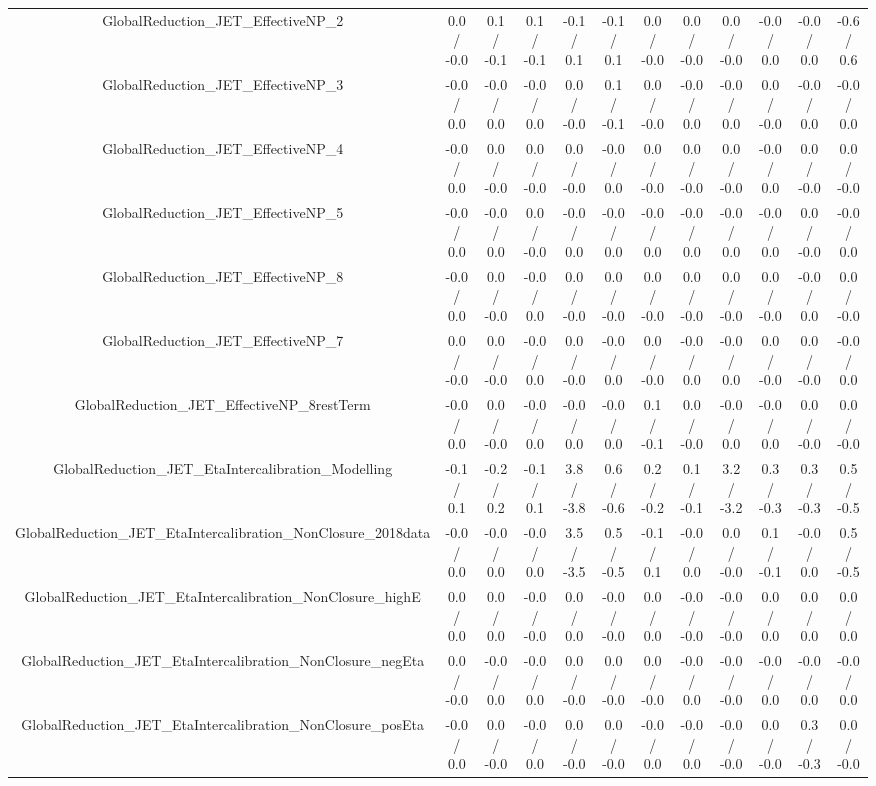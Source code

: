 \begin{table}[htbp]
\begin{center}
\begin{tabular}{|c|c|c|c|c|c|c|c|c|c|c|c|}
  GlobalReduction_JET_EffectiveNP_2 & 0.0 / -0.0 & 0.1 / -0.1 & 0.1 / -0.1 & -0.1 / 0.1 & -0.1 / 0.1 & 0.0 / -0.0 & 0.0 / -0.0 & 0.0 / -0.0 & -0.0 / 0.0 & -0.0 / 0.0 & -0.6 / 0.6 \\ 
  GlobalReduction_JET_EffectiveNP_3 & -0.0 / 0.0 & -0.0 / 0.0 & -0.0 / 0.0 & 0.0 / -0.0 & 0.1 / -0.1 & 0.0 / -0.0 & -0.0 / 0.0 & -0.0 / 0.0 & 0.0 / -0.0 & -0.0 / 0.0 & -0.0 / 0.0 \\ 
  GlobalReduction_JET_EffectiveNP_4 & -0.0 / 0.0 & 0.0 / -0.0 & 0.0 / -0.0 & 0.0 / -0.0 & -0.0 / 0.0 & 0.0 / -0.0 & 0.0 / -0.0 & 0.0 / -0.0 & -0.0 / 0.0 & 0.0 / -0.0 & 0.0 / -0.0 \\ 
  GlobalReduction_JET_EffectiveNP_5 & -0.0 / 0.0 & -0.0 / 0.0 & 0.0 / -0.0 & -0.0 / 0.0 & -0.0 / 0.0 & -0.0 / 0.0 & -0.0 / 0.0 & -0.0 / 0.0 & -0.0 / 0.0 & 0.0 / -0.0 & -0.0 / 0.0 \\ 
  GlobalReduction_JET_EffectiveNP_8 & -0.0 / 0.0 & 0.0 / -0.0 & -0.0 / 0.0 & 0.0 / -0.0 & 0.0 / -0.0 & 0.0 / -0.0 & 0.0 / -0.0 & 0.0 / -0.0 & 0.0 / -0.0 & -0.0 / 0.0 & 0.0 / -0.0 \\ 
  GlobalReduction_JET_EffectiveNP_7 & 0.0 / -0.0 & 0.0 / -0.0 & -0.0 / 0.0 & 0.0 / -0.0 & -0.0 / 0.0 & 0.0 / -0.0 & -0.0 / 0.0 & -0.0 / 0.0 & 0.0 / -0.0 & 0.0 / -0.0 & -0.0 / 0.0 \\ 
  GlobalReduction_JET_EffectiveNP_8restTerm & -0.0 / 0.0 & 0.0 / -0.0 & -0.0 / 0.0 & -0.0 / 0.0 & -0.0 / 0.0 & 0.1 / -0.1 & 0.0 / -0.0 & -0.0 / 0.0 & -0.0 / 0.0 & 0.0 / -0.0 & 0.0 / -0.0 \\ 
  GlobalReduction_JET_EtaIntercalibration_Modelling & -0.1 / 0.1 & -0.2 / 0.2 & -0.1 / 0.1 & 3.8 / -3.8 & 0.6 / -0.6 & 0.2 / -0.2 & 0.1 / -0.1 & 3.2 / -3.2 & 0.3 / -0.3 & 0.3 / -0.3 & 0.5 / -0.5 \\ 
  GlobalReduction_JET_EtaIntercalibration_NonClosure_2018data & -0.0 / 0.0 & -0.0 / 0.0 & -0.0 / 0.0 & 3.5 / -3.5 & 0.5 / -0.5 & -0.1 / 0.1 & -0.0 / 0.0 & 0.0 / -0.0 & 0.1 / -0.1 & -0.0 / 0.0 & 0.5 / -0.5 \\ 
  GlobalReduction_JET_EtaIntercalibration_NonClosure_highE & 0.0 / 0.0 & 0.0 / 0.0 & -0.0 / -0.0 & 0.0 / 0.0 & -0.0 / -0.0 & 0.0 / 0.0 & -0.0 / -0.0 & -0.0 / -0.0 & 0.0 / 0.0 & 0.0 / 0.0 & 0.0 / 0.0 \\ 
  GlobalReduction_JET_EtaIntercalibration_NonClosure_negEta & 0.0 / -0.0 & -0.0 / 0.0 & -0.0 / 0.0 & 0.0 / -0.0 & 0.0 / -0.0 & 0.0 / -0.0 & -0.0 / 0.0 & -0.0 / -0.0 & -0.0 / 0.0 & -0.0 / 0.0 & -0.0 / 0.0 \\ 
  GlobalReduction_JET_EtaIntercalibration_NonClosure_posEta & -0.0 / 0.0 & 0.0 / -0.0 & -0.0 / 0.0 & 0.0 / -0.0 & 0.0 / -0.0 & -0.0 / 0.0 & -0.0 / 0.0 & -0.0 / -0.0 & 0.0 / -0.0 & 0.3 / -0.3 & 0.0 / -0.0 \\ 

\end{tabular}
\end{center}
\end{table}
